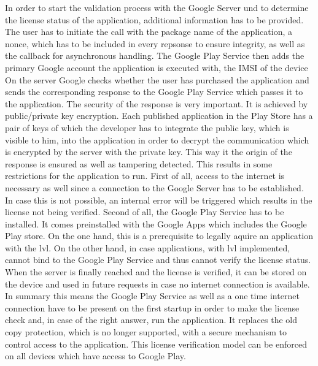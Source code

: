 In order to start the validation process with the Google Server und to determine the license status of the application, additional information has to be provided.
The user has to initiate the call with  the package name of the application, a nonce, which has to be included in every repsonse to ensure integrity, as well as the callback for asynchronous handling.
The Google Play Service then adds the primary Google account the application is executed with, the IMSI of the device
On the server Google checks whether the user has purchased the application and sends the corresponding response to the Google Play Service which passes it to the application. \cite{developersLicensingOverview}
\newline
The security of the response is very important.
It is achieved by public/private key encryption.
Each published application in the Play Store has a pair of keys of which the developer has to integrate the public key, which is visible to him, into the application in order to decrypt the communication which is encrypted by the server with the private key.
This way it the origin of the response is ensured as well as tampering detected.
\cite{munteanLicense}\cite{developersLicensingOverview}
\newline
This results in some restrictions for the application to run.
First of all, access to the internet is necessary as well since a connection to the Google Server has to be established.
In case this is not possible, an internal error will be triggered which results in the license not being verified.
Second of all, the Google Play Service has to be installed.
It comes preinstalled with the Google Apps which includes the Google Play store.
On the one hand, this is a prerequisite to legally aquire an application with the \gls{lvl}.
On the other hand, in case applications, with \gls{lvl} implemented, cannot bind to the Google Play Service and thus cannot verify the license status.
When the server is finally reached and the license is verified, it can be stored on the device and used in future requests in case no internet connection is available. \cite{developersLicensingAdding}\cite{developersLicensingOverview}
\newline
In summary this means the Google Play Service as well as a one time internet connection have to be present on the first startup in order to make the license check and, in case of the right answer, run the application.
It replaces the old copy protection, which is no longer supported, with a secure mechanism to control access to the application.
This license verification model can be enforced on all devices which have access to Google Play. \cite{developersLicensingAdding} \cite{developersLicensingOverview}
